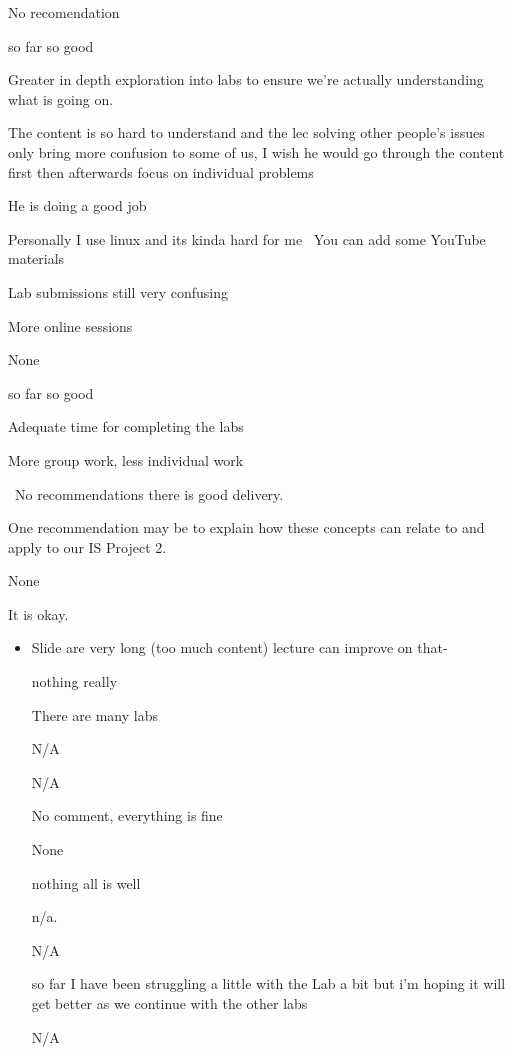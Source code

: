 \documentclass[
]{article}
\providecommand{\tightlist}{%
  \setlength{\itemsep}{0pt}\setlength{\parskip}{0pt}}
\begin{document}
\begin{enumerate}
\begin{itemize}
    No recomendation

    so far so good

    Greater in depth exploration into labs to ensure we're actually
    understanding what is going on.

    The content is so hard to understand and the lec solving other
    people's issues only bring more confusion to some of us, I wish he
    would go through the content first then afterwards focus on
    individual problems

    He is doing a good job

    Personally I use linux and its kinda hard for me~ You can add some
    YouTube materials~

    Lab submissions still very confusing

    More online sessions

    None

    so far so good

    Adequate time for completing the labs

    More group work, less individual work

    ~No recommendations there is good delivery.

    One recommendation may be to explain how these concepts can relate
    to and apply to our IS Project 2.

    None

    It is okay.

    \begin{itemize}
    \tightlist
    \item
      Slide are very long (too much content) lecture can improve on
      that-

      nothing really

      There are many labs

      N/A

      N/A

      No comment, everything is fine

      None

      nothing all is well

      n/a.

      N/A

      so far I have been struggling a little with the Lab a bit but i'm
      hoping it will get better as we continue with the other labs

      N/A
    \end{itemize}
  \end{itemize}
\end{enumerate}
\end{document}
